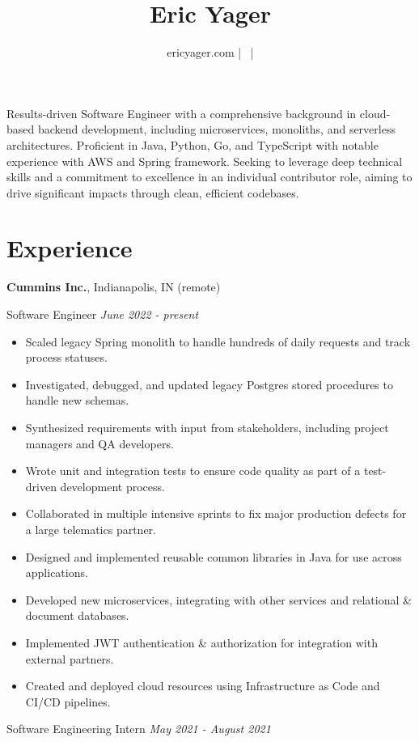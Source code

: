 \documentclass{article}
\title{Eric Yager}
\author{ericyager.com | \myEmail\ | \myPhoneNumber}
\date{}
\begin{document}
\maketitle

Results-driven Software Engineer with a comprehensive background in cloud-based backend development,
including microservices, monoliths, and serverless architectures. Proficient in Java, Python, Go, and TypeScript
with notable experience with AWS and Spring framework. Seeking to leverage deep technical skills and a
commitment to excellence in an individual contributor role, aiming to drive significant impacts through clean,
efficient codebases.

\section{Experience}

\textbf{Cummins Inc.}, Indianapolis, IN (remote)

Software Engineer \textit{June 2022 - present}

\begin{itemize}
    \item Scaled legacy Spring monolith to handle hundreds of daily requests and track process statuses.
    \item Investigated, debugged, and updated legacy Postgres stored procedures to handle new schemas.
    \item Synthesized requirements with input from stakeholders, including project managers and QA developers.
    \item Wrote unit and integration tests to ensure code quality as part of a test-driven development process.
    \item Collaborated in multiple intensive sprints to fix major production defects for a large telematics partner.
    \item Designed and implemented reusable common libraries in Java for use across applications.
    \item Developed new microservices, integrating with other services and relational \& document databases.
    \item Implemented JWT authentication \& authorization for integration with external partners.
    \item Created and deployed cloud resources using Infrastructure as Code and CI/CD pipelines.
\end{itemize}

Software Engineering Intern \textit{May 2021 - August 2021}
\end{document}
